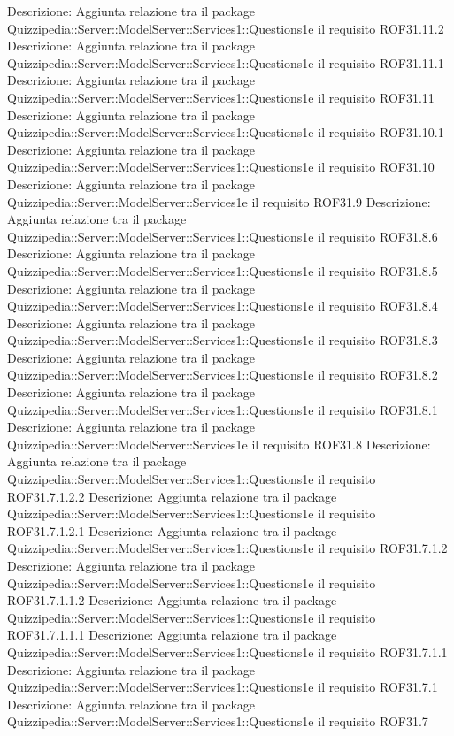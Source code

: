 Descrizione: Aggiunta relazione tra il package Quizzipedia::Server::ModelServer::Services1::Questions1e il requisito ROF31.11.2 
Descrizione: Aggiunta relazione tra il package Quizzipedia::Server::ModelServer::Services1::Questions1e il requisito ROF31.11.1 
Descrizione: Aggiunta relazione tra il package Quizzipedia::Server::ModelServer::Services1::Questions1e il requisito ROF31.11 
Descrizione: Aggiunta relazione tra il package Quizzipedia::Server::ModelServer::Services1::Questions1e il requisito ROF31.10.1 
Descrizione: Aggiunta relazione tra il package Quizzipedia::Server::ModelServer::Services1::Questions1e il requisito ROF31.10 
Descrizione: Aggiunta relazione tra il package Quizzipedia::Server::ModelServer::Services1e il requisito ROF31.9 
Descrizione: Aggiunta relazione tra il package Quizzipedia::Server::ModelServer::Services1::Questions1e il requisito ROF31.8.6 
Descrizione: Aggiunta relazione tra il package Quizzipedia::Server::ModelServer::Services1::Questions1e il requisito ROF31.8.5 
Descrizione: Aggiunta relazione tra il package Quizzipedia::Server::ModelServer::Services1::Questions1e il requisito ROF31.8.4 
Descrizione: Aggiunta relazione tra il package Quizzipedia::Server::ModelServer::Services1::Questions1e il requisito ROF31.8.3 
Descrizione: Aggiunta relazione tra il package Quizzipedia::Server::ModelServer::Services1::Questions1e il requisito ROF31.8.2 
Descrizione: Aggiunta relazione tra il package Quizzipedia::Server::ModelServer::Services1::Questions1e il requisito ROF31.8.1 
Descrizione: Aggiunta relazione tra il package Quizzipedia::Server::ModelServer::Services1e il requisito ROF31.8 
Descrizione: Aggiunta relazione tra il package Quizzipedia::Server::ModelServer::Services1::Questions1e il requisito ROF31.7.1.2.2 
Descrizione: Aggiunta relazione tra il package Quizzipedia::Server::ModelServer::Services1::Questions1e il requisito ROF31.7.1.2.1 
Descrizione: Aggiunta relazione tra il package Quizzipedia::Server::ModelServer::Services1::Questions1e il requisito ROF31.7.1.2 
Descrizione: Aggiunta relazione tra il package Quizzipedia::Server::ModelServer::Services1::Questions1e il requisito ROF31.7.1.1.2 
Descrizione: Aggiunta relazione tra il package Quizzipedia::Server::ModelServer::Services1::Questions1e il requisito ROF31.7.1.1.1 
Descrizione: Aggiunta relazione tra il package Quizzipedia::Server::ModelServer::Services1::Questions1e il requisito ROF31.7.1.1 
Descrizione: Aggiunta relazione tra il package Quizzipedia::Server::ModelServer::Services1::Questions1e il requisito ROF31.7.1 
Descrizione: Aggiunta relazione tra il package Quizzipedia::Server::ModelServer::Services1::Questions1e il requisito ROF31.7 
